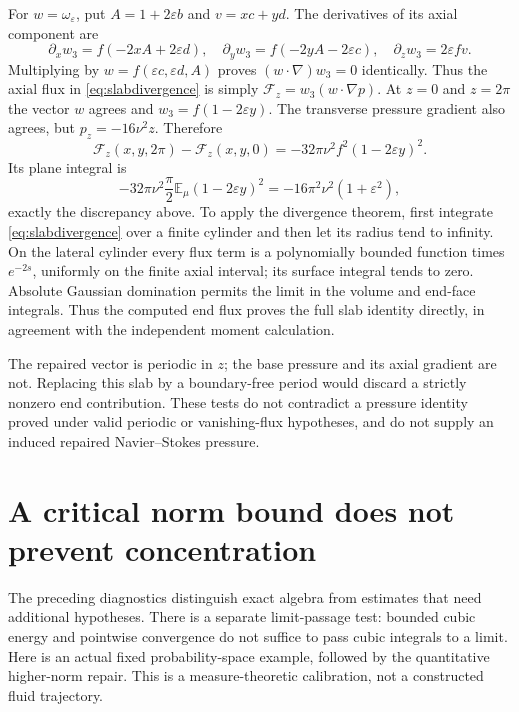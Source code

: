 \documentclass[11pt]{article}
\begin{document}
For $w=\omega_\varepsilon$, put
$A=1+2\varepsilon b$ and $v=xc+yd$.
The derivatives of its axial component are
\[
 \partial_x w_3=f(-2xA+2\varepsilon d),\quad
 \partial_y w_3=f(-2yA-2\varepsilon c),\quad
 \partial_z w_3=2\varepsilon fv.
\]
Multiplying by $w=f(\varepsilon c,\varepsilon d,A)$ proves
$(w\cdot\nabla)w_3=0$ identically. Thus the axial flux in
\eqref{eq:slabdivergence} is simply
$\mathcal F_z=w_3(w\cdot\nabla p)$.
At $z=0$ and $z=2\pi$ the vector $w$ agrees and
$w_3=f(1-2\varepsilon y)$. The transverse pressure gradient also
agrees, but $p_z=-16\nu^2z$. Therefore
\[
 \mathcal F_z(x,y,2\pi)-\mathcal F_z(x,y,0)
 =-32\pi\nu^2 f^2(1-2\varepsilon y)^2.
\]
Its plane integral is
\[
 -32\pi\nu^2\frac\pi2
   \mathbb E_\mu(1-2\varepsilon y)^2
 =-16\pi^2\nu^2(1+\varepsilon^2),
\]
exactly the discrepancy above.
To apply the divergence theorem, first integrate
\eqref{eq:slabdivergence} over a finite cylinder and then let its
radius tend to infinity. On the lateral cylinder every flux term
is a polynomially bounded function times $e^{-2s}$, uniformly on
the finite axial interval; its surface integral tends to zero.
Absolute Gaussian domination permits the limit in the volume and
end-face integrals. Thus the computed end flux proves the full slab
identity directly, in agreement with the independent moment calculation.

The repaired vector is periodic in $z$; the base pressure and its
axial gradient are not. Replacing this slab by a boundary-free period
would discard a strictly nonzero end contribution. These tests do not
contradict a pressure identity proved under valid periodic or
vanishing-flux hypotheses, and do not supply an induced repaired
Navier--Stokes pressure.


\section{A critical norm bound does not prevent concentration}
The preceding diagnostics distinguish exact algebra from estimates that
need additional hypotheses. There is a separate limit-passage test:
bounded cubic energy and pointwise convergence do not suffice to pass
cubic integrals to a limit. Here is an actual fixed probability-space
example, followed by the quantitative higher-norm repair. This is a
measure-theoretic calibration, not a constructed fluid trajectory.
\end{document}

